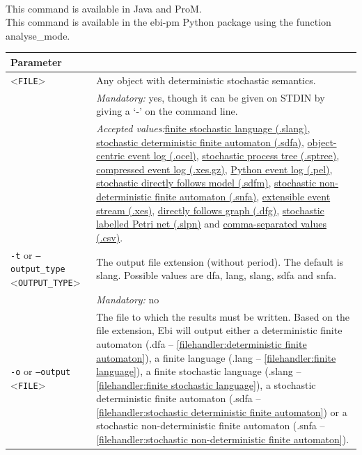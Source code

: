 {\\This command is available in Java and ProM.
\\This command is available in the ebi-pm Python package using the function analyse\_mode.
\begin{tabularx}{\linewidth}{lX}
\toprule
Parameter \\\midrule
<\texttt{FILE}>&Any object with deterministic stochastic semantics.\\
&\textit{Mandatory:} \quad yes, though it can be given on STDIN by giving a `-' on the command line.\\
&\textit{Accepted values:}\quad \hyperref[filehandler:finite stochastic language]{finite stochastic language (.slang)}, \hyperref[filehandler:stochastic deterministic finite automaton]{stochastic deterministic finite automaton (.sdfa)}, \hyperref[filehandler:object-centric event log]{object-centric event log (.ocel)}, \hyperref[filehandler:stochastic process tree]{stochastic process tree (.sptree)}, \hyperref[filehandler:compressed event log]{compressed event log (.xes.gz)}, \hyperref[filehandler:Python event log]{Python event log (.pel)}, \hyperref[filehandler:stochastic directly follows model]{stochastic directly follows model (.sdfm)}, \hyperref[filehandler:stochastic non-deterministic finite automaton]{stochastic non-deterministic finite automaton (.snfa)}, \hyperref[filehandler:extensible event stream]{extensible event stream (.xes)}, \hyperref[filehandler:directly follows graph]{directly follows graph (.dfg)}, \hyperref[filehandler:stochastic labelled Petri net]{stochastic labelled Petri net (.slpn)} and \hyperref[filehandler:comma-separated values]{comma-separated values (.csv)}.\\
\texttt{-t} or \texttt{--output\_type} <\texttt{OUTPUT\_TYPE}> &
The output file extension (without period). The default is slang. Possible values are dfa, lang, slang, sdfa and snfa.\\
&\textit{Mandatory:} \quad no\\
\texttt{-o} or \texttt{--output} <\texttt{FILE}> &
The file to which the results must be written. Based on the file extension, Ebi will output either a deterministic finite automaton (.dfa -- \cref{filehandler:deterministic finite automaton}), a finite language (.lang -- \cref{filehandler:finite language}), a finite stochastic language (.slang -- \cref{filehandler:finite stochastic language}), a stochastic deterministic finite automaton (.sdfa -- \cref{filehandler:stochastic deterministic finite automaton}) or a stochastic non-deterministic finite automaton (.snfa -- \cref{filehandler:stochastic non-deterministic finite automaton}).

\end{tabularx}}
